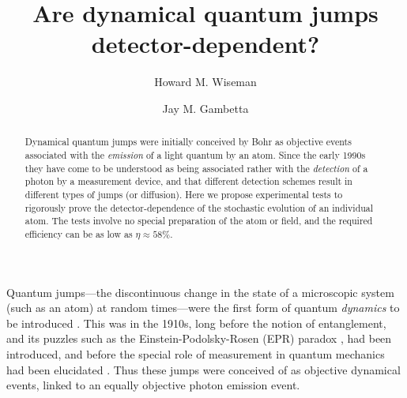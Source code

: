 \documentclass[12pt,prl,floatfix,showpacs,superscriptaddress,amsmath,amssymb]{revtex4}
\renewcommand{\(}{\left(}
\renewcommand{\)}{\right)}
\begin{document}
\title{Are dynamical quantum jumps  detector-dependent?}

\author{Howard M. Wiseman}
\author{Jay M. Gambetta}




\begin{abstract}
Dynamical quantum jumps were initially conceived by Bohr  as objective events associated with the {\em emission} of a light quantum by an atom. Since the early 1990s they have come to be understood as being associated rather with the {\em detection} of a photon by  a measurement device, and that different detection schemes result in different types of jumps (or diffusion). 
Here we  propose experimental tests to rigorously prove the  detector-dependence of the stochastic evolution of an individual atom. 
The tests involve no special preparation of the atom or field, and the required efficiency can be as low as $\eta \approx 58\%$. 
\end{abstract}


\maketitle

Quantum jumps---the discontinuous change in the state of a microscopic system (such as an atom) at random times---were the first form of quantum {\em dynamics} to be introduced \cite{Boh13,Ein17}. 
This was in the 1910s,  long before the notion of entanglement, and its puzzles such as the Einstein-Podolsky-Rosen (EPR) paradox \cite{EPR35}, had been  introduced, and before the special role of measurement in quantum mechanics had been elucidated \cite{Von32}. Thus these 
jumps were conceived of as objective dynamical events, linked to an equally objective photon emission event.  
\end{document}
